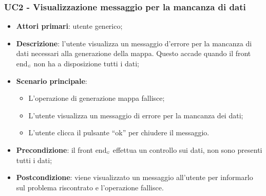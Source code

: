 \subsubsection{UC2 - Visualizzazione messaggio per la mancanza di dati }\label{CasiDUsoCasiDUsoTraUnUtenteEIlFrontEndElencoCasiDUsoUC2VisualizzazioneMessaggioPerLaMancanzaDiDati} %
\begin{itemize}
	\item \textbf{Attori primari}: utente generico;
	\item \textbf{Descrizione}: l’utente visualizza un messaggio d’errore per la mancanza di dati necessari alla generazione della mappa. Questo accade quando il front end$_{\scaleto{G}{3pt}}$ non ha a disposizione tutti i dati;
	\item \textbf{Scenario principale}: 
	\begin{itemize}
		\item L’operazione di generazione mappa fallisce;
		\item L’utente visualizza un messaggio di errore per la mancanza dei dati;
		\item L’utente clicca il pulsante “ok” per chiudere il messaggio.
	\end{itemize}
	\item \textbf{Precondizione}: il front end$_{\scaleto{G}{3pt}}$ effettua un controllo sui dati, non sono presenti tutti i dati;
	\item \textbf{Postcondizione}: viene visualizzato un messaggio all’utente per informarlo sul problema riscontrato e l’operazione fallisce.
\end{itemize}

